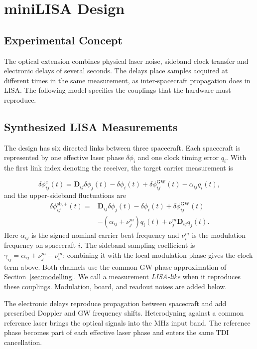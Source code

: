 \documentclass[aps,twocolumn,10pt,nofootinbib,floatfix]{revtex4-2}
\begin{document}
\section{miniLISA Design}
\label{sec:setup}

\subsection{Experimental Concept}
The optical extension combines physical laser noise, sideband clock transfer and electronic delays of several seconds. The delays place samples acquired at different times in the same measurement, as inter-spacecraft propagation does in LISA. The following model specifies the couplings that the hardware must reproduce.

\subsection{Synthesized LISA Measurements}
The design has six directed links between three spacecraft. Each spacecraft is represented by one effective laser phase $\delta\phi_i$ and one clock timing error $q_i$. With the first link index denoting the receiver, the target carrier measurement is

\begin{equation*}
    \delta\phi^{\mathrm c}_{ij}(t)
    =\mathbf D_{ij}\delta\phi_j(t)-\delta\phi_i(t)
    +\delta\phi^{\mathrm{GW}}_{ij}(t)-\alpha_{ij}q_i(t),
\end{equation*}
and the upper-sideband fluctuations are
\begin{align*}
    \delta\phi^{\mathrm{sb,+}}_{ij}(t)={}&
    \mathbf D_{ij}\delta\phi_j(t)-\delta\phi_i(t)
    +\delta\phi^{\mathrm{GW}}_{ij}(t)\\
    &-(\alpha_{ij}+\nu_j^m)q_i(t)+\nu_j^m\mathbf D_{ij}q_j(t).
\end{align*}
Here $\alpha_{ij}$ is the signed nominal carrier beat frequency and $\nu_i^m$ is the modulation frequency on spacecraft $i$. The sideband sampling coefficient is $\gamma_{ij}=\alpha_{ij}+\nu_j^m-\nu_i^m$; combining it with the local modulation phase gives the clock term above. Both channels use the common GW phase approximation of Section~\ref{sec:modelling}. We call a measurement \emph{LISA-like} when it reproduces these couplings. Modulation, board, and readout noises are added below.

The electronic delays reproduce propagation between spacecraft and add prescribed Doppler and GW frequency shifts. Heterodyning against a common reference laser brings the optical signals into the MHz input band. The reference phase becomes part of each effective laser phase and enters the same TDI cancellation.
\end{document}
